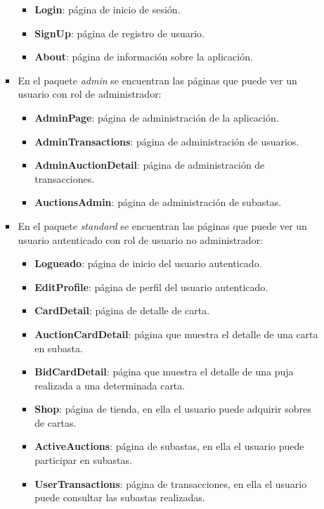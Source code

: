 \begin{itemize}
\begin{itemize}
\begin{itemize}
\begin{itemize}
                \item \textbf{Login}: página de inicio de sesión.
                \item \textbf{SignUp}: página de registro de usuario.
                \item \textbf{About}: página de información sobre la aplicación.
            \end{itemize}
             \item En el paquete \textit{admin} se encuentran las páginas que puede ver un usuario con rol de administrador:
            \begin{itemize}
                \item \textbf{AdminPage}: página de administración de la aplicación.
                \item \textbf{AdminTransactions}: página de administración de usuarios.
                \item \textbf{AdminAuctionDetail}: página de administración de transacciones.
                \item \textbf{AuctionsAdmin}: página de administración de subastas.
            \end{itemize}
            \item En el paquete \textit{standard} se encuentran las páginas que puede ver un usuario autenticado con rol de usuario no administrador:
            \begin{itemize}
                \item \textbf{Logueado}: página de inicio del usuario autenticado.
                \item \textbf{EditProfile}: página de perfil del usuario autenticado.
                \item \textbf{CardDetail}: página de detalle de carta.
                \item \textbf{AuctionCardDetail}: página que muestra el detalle de una carta en subasta.
                \item \textbf{BidCardDetail}: página que muestra el detalle de una puja realizada a una determinada carta.
                \item \textbf{Shop}: página de tienda, en ella el usuario puede adquirir sobres de cartas.
                \item \textbf{ActiveAuctions}: página de subastas, en ella el usuario puede participar en subastas.
                \item \textbf{UserTransactions}: página de transacciones, en ella el usuario puede consultar las subastas realizadas.

\end{itemize}
\end{itemize}
\end{itemize}
\end{itemize}
